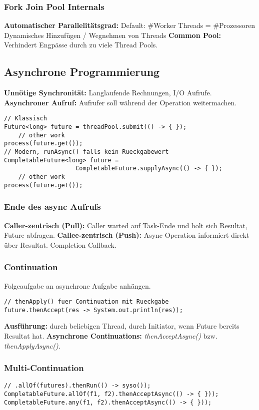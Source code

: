 \subsubsection{Fork Join Pool Internals}
\textbf{Automatischer Parallelitätsgrad:} Default: \#Worker Threads = \#Prozessoren
Dynamisches Hinzufügen / Wegnehmen von Threads
\textbf{Common Pool:} Verhindert Engpässe durch zu viele Thread Pools.


\subsection{Asynchrone Programmierung}
\textbf{Unnötige Synchronität:} Langlaufende Rechnungen, I/O Aufrufe.\\ 
\textbf{Asynchroner Aufruf:} Aufrufer soll während der Operation weitermachen.

\begin{lstlisting}
// Klassisch
Future<long> future = threadPool.submit(() -> { });
    // other work 
process(future.get());
// Modern, runAsync() falls kein Rueckgabewert
CompletableFuture<long> future = 
                    CompletableFuture.supplyAsync(() -> { });
    // other work 
process(future.get());
\end{lstlisting}

\subsubsection{Ende des async Aufrufs}
\textbf{Caller-zentrisch (Pull):} Caller warted auf Task-Ende und holt sich Resultat, Future abfragen.
\textbf{Callee-zentrisch (Push):} Async Operation informiert direkt über Resultat. Completion Callback.

\subsubsection{Continuation}
Folgeaufgabe an asynchrone Aufgabe anhängen.
\begin{lstlisting}
// thenApply() fuer Continuation mit Rueckgabe
future.thenAccept(res -> System.out.println(res));
\end{lstlisting}
\textbf{Ausführung:} durch beliebigen Thread, durch Initiator, wenn Future bereits Resultat hat.
\textbf{Asynchrone Continuations:} \textit{thenAcceptAsync()} bzw. \textit{thenApplyAsync()}.

\subsubsection{Multi-Continuation}
\begin{lstlisting}
// .allOf(futures).thenRun(() -> syso());
CompletableFuture.allOf(f1, f2).thenAcceptAsync(() -> { }));
CompletableFuture.any(f1, f2).thenAcceptAsync(() -> { }));
\end{lstlisting}

